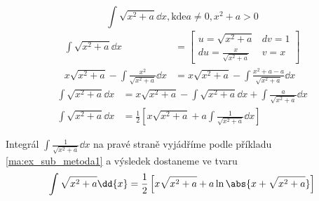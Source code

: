 \begin{mdframed}[style=mdexam]
  \begin{example}\label{mai:exam114}
    \begin{equation}\label{mai:exam016_003}
      \int{\sqrt{x^2+a}\dd{x}}, \text{kde} a\neq0, x^2+a>0
    \end{equation}  
    \begin{align*}
      \int{\sqrt{x^2+a}\dd{x}}                           &=
        \left[
          \begin{array}{cc} 
             u =\sqrt{x^2+a}              & dv = 1 \\ 
            du =\displaystyle
                  \frac{x}{\sqrt{x^2+a}}  &  v = x
          \end{array}
        \right]                                                                                   \\
      x\sqrt{x^2+a}-\int{\frac{x^2}{\sqrt{x^2+a}}\dd{x}} &= 
        \displaystyle{x\sqrt{x^2+a}-\int{\frac{x^2+a-a}{\sqrt{x^2+a}}\dd{x}}}                        
    \end{align*}\vspace*{-1em}
    \begin{align*}
      \int{\sqrt{x^2+a}\dd{x}}                           &= 
        \displaystyle{x\sqrt{x^2+a}-\int{\sqrt{x^2+a}\dd{x}} + \int{\frac{a}{\sqrt{x^2+a}}\dd{x}}}      \\
      \int{\sqrt{x^2+a}\dd{x}}                           &= 
        \frac{1}{2}\left[x\sqrt{x^2+a}+a\int{\frac{1}{\sqrt{x^2+a}}}\dd{x}\right]
    \end{align*}
    
    Integrál \(\int\frac{1}{\sqrt{x^2+a}}\dd{x}\) na pravé straně vyjádříme podle příkladu 
    \ref{ma:ex_sub_metoda1} a výsledek do\-sta\-ne\-me ve tvaru
    \begin{equation*}
      \int\displaystyle{{\sqrt{x^2+a}\dd{x}}
          =\frac{1}{2}\left[x\sqrt{x^2+a}+a\ln{\abs{x + \sqrt{x^2+a}}}\right]}
    \end{equation*}
  \end{example}
\end{mdframed}